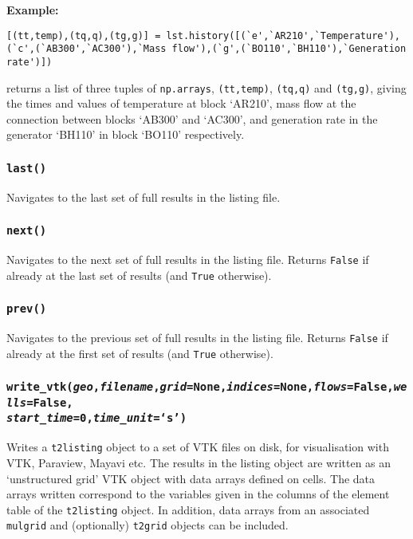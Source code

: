 \textbf{Example:}

\begin{verbatim}
[(tt,temp),(tq,q),(tg,g)] = lst.history([(`e',`AR210',`Temperature'),
(`c',(`AB300',`AC300'),`Mass flow'),(`g',(`BO110',`BH110'),`Generation rate')])
\end{verbatim}

returns a list of three tuples of \texttt{np.arrays}, \texttt{(tt,temp)}, \texttt{(tq,q)} and \texttt{(tg,g)}, giving the times and values of temperature at block `AR210', mass flow at the connection between blocks `AB300' and `AC300', and generation rate in the generator `BH110' in block `BO110' respectively.

\subsubsection{\texttt{last()}}

Navigates to the last set of full results in the listing file.

\subsubsection{\texttt{next()}}

Navigates to the next set of full results in the listing file.  Returns \texttt{False} if already at the last set of results (and \texttt{True} otherwise).

\subsubsection{\texttt{prev()}}

Navigates to the previous set of full results in the listing file.  Returns \texttt{False} if already at the first set of results (and \texttt{True} otherwise).

\subsubsection{\texttt{write\_vtk(\emph{geo},\emph{filename},\emph{grid}=None,\emph{indices}=None,\emph{flows}=False,\emph{wells}=False,\\
\emph{start\_time}=0,\emph{time\_unit}=`s')}}

Writes a \texttt{t2listing} object to a set of VTK files on disk, for visualisation with VTK, Paraview, Mayavi etc.  The results in the listing object are written as an `unstructured grid' VTK object with data arrays defined on cells.  The data arrays written correspond to the variables given in the columns of the element table of the \texttt{t2listing} object.  In addition, data arrays from an associated \texttt{mulgrid} and (optionally) \texttt{t2grid} objects can be included.

